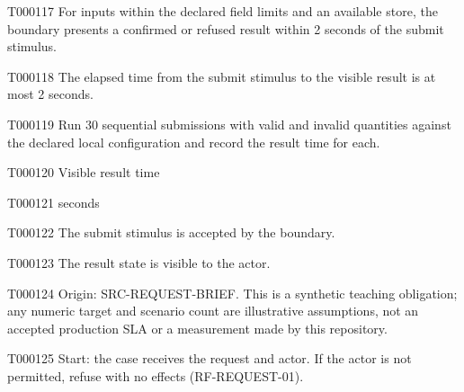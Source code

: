 \documentclass[11pt,a4paper]{article}
\begin{document}
\begin{atlasparagraph}{T000117}
For inputs within the declared field limits and an available store, the boundary presents a confirmed or refused result within 2 seconds of the submit stimulus.
\end{atlasparagraph}
\begin{atlasparagraph}{T000118}
The elapsed time from the submit stimulus to the visible result is at most 2 seconds.
\end{atlasparagraph}
\begin{atlasparagraph}{T000119}
Run 30 sequential submissions with valid and invalid quantities against the declared local configuration and record the result time for each.
\end{atlasparagraph}
\begin{atlastext}{T000120}
Visible result time
\end{atlastext}
\begin{atlastext}{T000121}
seconds
\end{atlastext}
\begin{atlasparagraph}{T000122}
The submit stimulus is accepted by the boundary.
\end{atlasparagraph}
\begin{atlasparagraph}{T000123}
The result state is visible to the actor.
\end{atlasparagraph}
\begin{atlasparagraph}{T000124}
Origin: SRC-REQUEST-BRIEF. This is a synthetic teaching obligation; any numeric target and scenario count are illustrative assumptions, not an accepted production SLA or a measurement made by this repository.
\end{atlasparagraph}
\begin{atlasparagraph}{T000125}
Start: the case receives the request and actor. If the actor is not permitted, refuse with no effects (RF-REQUEST-01).
\end{atlasparagraph}
\end{document}
